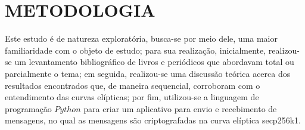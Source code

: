 \section{METODOLOGIA}

	Este estudo é de natureza exploratória, busca-se por meio dele, uma maior familiaridade com o objeto de estudo; para sua realização, inicialmente, realizou-se um levantamento bibliográfico de livros e periódicos que abordavam total ou parcialmente o tema; em seguida, realizou-se uma discussão teórica acerca dos resultados encontrados que, de maneira sequencial, corroboram com o entendimento das curvas elípticas; por fim, utilizou-se a linguagem de programação $Python$ para criar um aplicativo para envio e recebimento de mensagens, no qual as mensagens são criptografadas na curva elíptica secp256k1.
	
